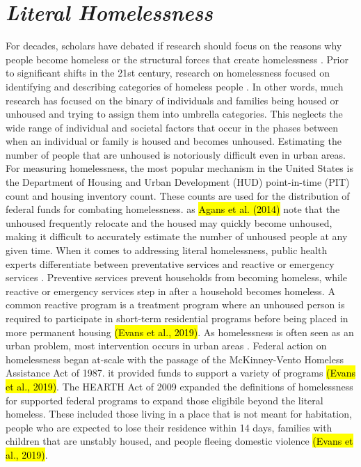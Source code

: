 \section{\textit{Literal Homelessness}}
For decades, scholars have debated if research should focus on the reasons why people become homeless or the structural forces that create homelessness \citep{shlay_social_2003}. Prior to significant shifts in the 21st century, research on homelessness focused on identifying and describing categories of homeless people \citep{lee_homelessness_2021}. In other words, much research has focused on the binary of individuals and families being housed or unhoused and trying to assign them into umbrella categories. This neglects the wide range of individual and societal factors that occur in the phases between when an individual or family is housed and becomes unhoused. Estimating the number of people that are unhoused is notoriously difficult even in urban areas. For measuring homelessness, the most popular mechanism in the United States is the Department of Housing and Urban Development (HUD) point-in-time (PIT) count and housing inventory count. These counts are used for the distribution of federal funds for combating homelessness. as \hl{Agans et al. (2014)} note that the unhoused frequently relocate and the housed may quickly become unhoused, making it difficult to accurately estimate the number of unhoused people at any given time. When it comes to addressing literal homelessness, public health experts differentiate between preventative services and reactive or emergency services \citep{oregan_how_2021}. Preventive services prevent households from becoming homeless, while reactive or emergency services step in after a household becomes homeless. A common reactive program is a treatment program where an unhoused person is required to participate in short-term residential programs before being placed in more permanent housing \hl{(Evans et al., 2019)}. As homelessness is often seen as an urban problem, most intervention occurs in urban areas \citep{gleason_using_2021}. Federal action on homelessness began at-scale with the passage of the McKinney-Vento Homeless Assistance Act of 1987. it provided funds to support a variety of programs \hl{(Evans et al., 2019)}. The HEARTH Act of 2009 expanded the definitions of homelessness for supported federal programs to expand those eligibile beyond the literal homeless. These included those living in a place that is not meant for habitation, people who are expected to lose their residence within 14 days, families with children that are unstably housed, and people fleeing domestic violence \hl{(Evans et al., 2019)}. 

